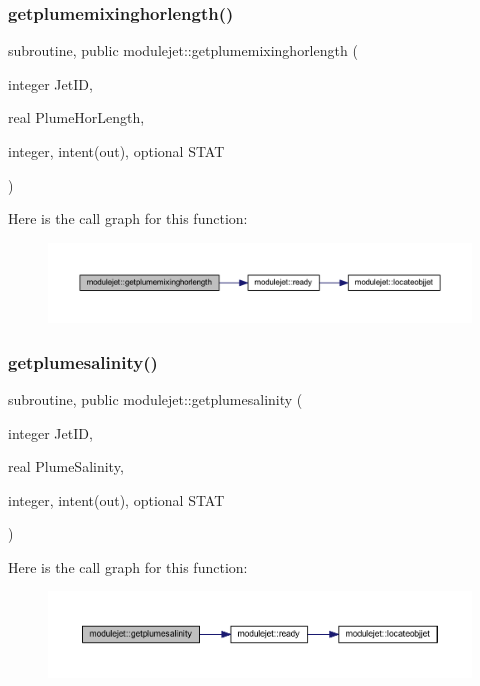 \subsubsection{\texorpdfstring{getplumemixinghorlength()}{getplumemixinghorlength()}}
{\footnotesize\ttfamily subroutine, public modulejet\+::getplumemixinghorlength (\begin{DoxyParamCaption}\item[{integer}]{Jet\+ID,  }\item[{real}]{Plume\+Hor\+Length,  }\item[{integer, intent(out), optional}]{S\+T\+AT }\end{DoxyParamCaption})}

Here is the call graph for this function\+:\nopagebreak
\begin{figure}[H]
\begin{center}
\leavevmode
\includegraphics[width=350pt]{namespacemodulejet_a105341ffdec09f8266a68d6db9beba7f_cgraph}
\end{center}
\end{figure}
\mbox{\label{namespacemodulejet_a6a3b06a4b31a48d3feabf8b545a6e8b2}} 
\subsubsection{\texorpdfstring{getplumesalinity()}{getplumesalinity()}}
{\footnotesize\ttfamily subroutine, public modulejet\+::getplumesalinity (\begin{DoxyParamCaption}\item[{integer}]{Jet\+ID,  }\item[{real}]{Plume\+Salinity,  }\item[{integer, intent(out), optional}]{S\+T\+AT }\end{DoxyParamCaption})}

Here is the call graph for this function\+:\nopagebreak
\begin{figure}[H]
\begin{center}
\leavevmode
\includegraphics[width=350pt]{namespacemodulejet_a6a3b06a4b31a48d3feabf8b545a6e8b2_cgraph}
\end{center}
\end{figure}
\mbox{\label{namespacemodulejet_aa64ddb0bd7c80f966b8ec54eb9a36c7c}} 
